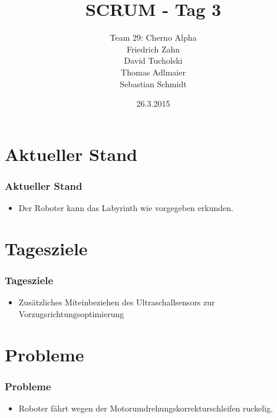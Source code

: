 \documentclass[ddcfooter,nototalpage]{tudbeamer}
\begin{document}
\title{SCRUM - Tag 3}
\author{Team 29: Cherno Alpha \\ 
Friedrich Zahn \\ 
David Tucholski \\
Thomas Adlmaier \\ 
Sebastian Schmidt
}

\date{26.3.2015}
\maketitle

\section{Aktueller Stand}
\begin{frame}
\frametitle{Aktueller Stand}
\normalsize
\begin{itemize}
  \item Der Roboter kann das Labyrinth wie vorgegeben erkunden.
\end{itemize}
\end{frame}

\section{Tagesziele}
\begin{frame}
\frametitle{Tagesziele}
\normalsize
\begin{itemize}
  \item Zusätzliches Miteinbeziehen des Ultraschallsensors zur Vorzugsrichtungsoptimierung
\end{itemize}
\end{frame}

\section{Probleme}
\begin{frame}
\frametitle{Probleme}
\normalsize
\begin{itemize}
  \item Roboter fährt wegen der Motorumdrehungskorrekturschleifen ruckelig.
\end{itemize}
\end{frame}
\end{document}
